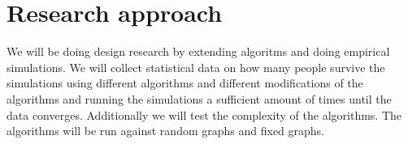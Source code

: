\chapter{Research approach}
\label{ch:approach}



We will be doing design research by extending algoritms and doing empirical simulations. 
We will collect statistical data on how many people survive the simulations
using different algorithms and different modifications of the algorithms and
running the simulations a sufficient amount of times until the data converges.
Additionally we will test the complexity of the algorithms.
The algorithms will be run against random graphs and fixed graphs. 


